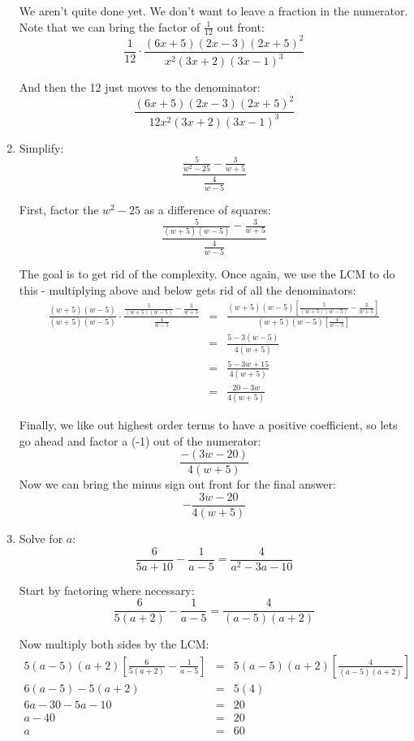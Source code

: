 \documentclass[letterpaper,12pt,fleqn]{article}
\begin{document}
\begin{enumerate}
  We aren't quite done yet. We don't want to leave a fraction in the numerator. Note
  that we can bring the factor of $\frac{1}{12}$ out front:
  \[\frac{1}{12}\cdot\frac{(6x+5)(2x-3)(2x+5)^2}{x^2(3x+2)(3x-1)^3}\]

  And then the 12 just moves to the denominator:
  \[\frac{(6x+5)(2x-3)(2x+5)^2}{12x^2(3x+2)(3x-1)^3}\]

\item Simplify:
  \[\frac{\frac{5}{w^2-25}-\frac{3}{w+5}}{\frac{4}{w-5}}\]

  First, factor the $w^2-25$ as a difference of squares:
  \[\frac{\frac{5}{(w+5)(w-5)}-\frac{3}{w+5}}{\frac{4}{w-5}}\]

  The goal is to get rid of the complexity.  Once again, we use the LCM to do this -
  multiplying above and below gets rid of all the denominators:
  \begin{eqnarray*}
    \frac{(w+5)(w-5)}{(w+5)(w-5)}\cdot
    \frac{\frac{5}{(w+5)(w-5)}-\frac{3}{w+5}}{\frac{4}{w-5}} &=&
    \frac{(w+5)(w-5)\left[\frac{5}{(w+5)(w-5)}-\frac{3}{w+5}\right]}
         {(w+5)(w-5)\left[\frac{4}{w-5}\right]} \\
    &=& \frac{5-3(w-5)}{4(w+5)} \\
    &=& \frac{5-3w+15}{4(w+5)} \\
    &=& \frac{20-3w}{4(w+5)}
  \end{eqnarray*}

  Finally, we like out highest order terms to have a positive coefficient, so lets go
  ahead and factor a (-1) out of the numerator:
  \[\frac{-(3w-20)}{4(w+5)}\]
  Now we can bring the minus sign out front for the final answer:
  \[-\frac{3w-20}{4(w+5)}\]

\item Solve for $a$:
  \[\frac{6}{5a+10}-\frac{1}{a-5}=\frac{4}{a^2-3a-10}\]

  Start by factoring where necessary:
  \[\frac{6}{5(a+2)}-\frac{1}{a-5}=\frac{4}{(a-5)(a+2)}\]

  Now multiply both sides by the LCM:
  \begin{eqnarray*}
    5(a-5)(a+2)\left[\frac{6}{5(a+2)}-\frac{1}{a-5}\right] &=&
    5(a-5)(a+2)\left[\frac{4}{(a-5)(a+2)}\right] \\
    6(a-5)-5(a+2) &=& 5(4) \\
    6a-30-5a-10 &=& 20 \\
    a-40 &=& 20 \\
    a &=& 60
  \end{eqnarray*}


\end{enumerate}
\end{document}
